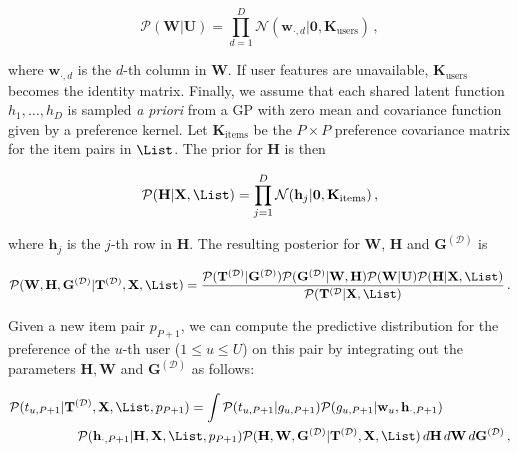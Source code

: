 \begin{equation}
	\mathcal{P}(\mathbf{W}|\mathbf{U})=  
	\prod_{d=1}^D \mathcal{N}(\mathbf{w}_{\cdot,d}|\mathbf{0},\mathbf{K}_\text{users})\,,\label{eqn:preference_priorW}
\end{equation}

where $\mathbf{w}_{\cdot,d}$ is the $d$-th column in $\mathbf{W}$. If user features are unavailable, $\mathbf{K}_\text{users}$ becomes the identity matrix. Finally, we assume that each shared latent function $h_1,\ldots,h_D$ is sampled \textit{a priori} from a GP with zero mean and covariance function given by a preference kernel.  Let $\mathbf{K}_\text{items}$ be the $P \times P$ preference covariance  matrix for the item pairs in $\List$. The prior for $\mathbf{H}$ is then 

\begin{equation}
	\mathcal{P}(\mathbf{H}|\mathbf{X},\List) = 
	\prod_{j=1}^{D}\mathcal{N}(\mathbf{h}_j|\mathbf{0},\mathbf{K}_\text{items})\,,\label{eqn:preference_priorH}
\end{equation}

where $\mathbf{h}_j$ is the $j$-th row in $\mathbf{H}$. The resulting posterior for $\mathbf{W}$, $\mathbf{H}$ and $\mathbf{G}^{(\mathcal{D})}$ is

\begin{equation}
	\mathcal{P}(\mathbf{W},\mathbf{H},\mathbf{G}^{(\mathcal{D})}|\mathbf{T}^{(\mathcal{D})},\mathbf{X},\List) =
	\frac{\mathcal{P}(\mathbf{T}^{(\mathcal{D})}|\mathbf{G}^{(\mathcal{D})})
	\mathcal{P}(\mathbf{G}^{(\mathcal{D})}|\mathbf{W},\mathbf{H})\mathcal{P}(\mathbf{W}|\mathbf{U})\mathcal{P}(\mathbf{H}|\mathbf{X},\List)} 
	{\mathcal{P}(\mathbf{T}^{(\mathcal{D}}|\mathbf{X},\List)}\,.\label{eqn:preference_post}
\end{equation}

Given a new item pair $p_{P+1}$, we can compute the predictive distribution for the preference of the $u$-th user ($1 \leq u \leq U$) on this pair by integrating out the parameters $\mathbf{H},\mathbf{W}$ and $\mathbf{G}^{(\mathcal{D})}$ as follows:

\begin{align}
	\mathcal{P}(t_{u,P+1}|&\mathbf{T}^{(\mathcal{D})},\mathbf{X},\List,p_{P+1}) =
	\int \mathcal{P}(t_{u,P+1}|g_{u,P+1}) \mathcal{P}(g_{u,P+1}|\mathbf{w}_u,\mathbf{h}_{\cdot,P+1})\notag\\
	 & \quad \mathcal{P}(\mathbf{h}_{\cdot,P+1}|\mathbf{H},\mathbf{X},\List,p_{P+1})
	\mathcal{P}(\mathbf{H},\mathbf{W},\mathbf{G}^{(\mathcal{D})}|\mathbf{T}^{(\mathcal{D})},\mathbf{X},\List)
	\,d\mathbf{H}\,d\mathbf{W}\,d\mathbf{G}^{(\mathcal{D})}\,,
	\label{eqn:preference_predictions}
\end{align}

